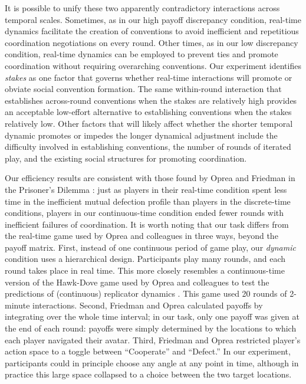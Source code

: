 \documentclass[10pt,letterpaper]{article}
\begin{document}
It is possible to unify these two apparently contradictory interactions across temporal scales.  Sometimes, as in our high payoff discrepancy condition, real-time dynamics facilitate the creation of conventions to avoid inefficient and repetitious coordination negotiations on every round.  Other times, as in our low discrepancy condition, real-time dynamics can be employed to prevent ties and promote coordination without requiring overarching conventions.  Our experiment identifies \emph{stakes} as one factor that governs whether real-time interactions will promote or obviate social convention formation.  The same within-round interaction that establishes across-round conventions when the stakes are relatively high provides an acceptable low-effort alternative to establishing conventions when the stakes relatively low.  Other factors that will likely affect whether the shorter temporal dynamic promotes or impedes the longer dynamical adjustment include the difficulty involved in establishing conventions, the number of rounds of iterated play, and the existing social structures for promoting coordination.

Our efficiency results are consistent with those found by Oprea and Friedman in the Prisoner's Dilemma \cite{FriedmanOprea12_ContinuousDilemma}: just as players in their real-time condition spent less time in the inefficient mutual defection profile than players in the discrete-time conditions, players in our continuous-time condition ended fewer rounds with inefficient failures of coordination. It is worth noting that our task differs from the real-time game used by Oprea and colleagues in three ways, beyond the payoff matrix. First, instead of one continuous period of game play, our \emph{dynamic} condition uses a hierarchical design. Participants play many rounds, and each round takes place in real time. This more closely resembles a continuous-time version of the Hawk-Dove game used by Oprea and colleagues to test the predictions of (continuous) replicator dynamics  \cite{OpreaHenwoodFriedman11_HawksDoves}. This game used 20 rounds of 2-minute interactions. Second, Friedman and Oprea calculated payoffs by integrating over the whole time interval; in our task, only one payoff was given at the end of each round: payoffs were simply determined by the locations to which each player navigated their avatar. Third, Friedman and Oprea restricted player's action space to a toggle between ``Cooperate'' and ``Defect.'' In our experiment, participants could in principle choose any angle at any point in time, although in practice this large space collapsed to a choice between the two target locations.
\end{document}
